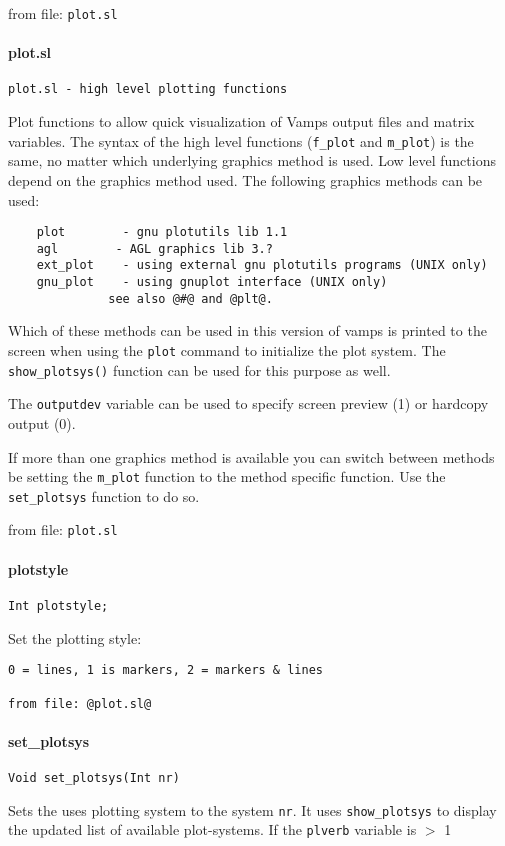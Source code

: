 from file: {\tt plot.sl}


\paragraph{plot.sl}
\begin{verbatim}
plot.sl - high level plotting functions
\end{verbatim}
Plot functions to allow quick visualization of Vamps output files
and matrix variables. The syntax of the high level functions ({\tt f\_plot}
and {\tt m\_plot}) is the same, no matter which underlying graphics method
is used. Low level functions depend on the graphics method used. The
following graphics methods can be used:
\begin{verbatim}
    plot        - gnu plotutils lib 1.1
    agl        - AGL graphics lib 3.?
    ext_plot    - using external gnu plotutils programs (UNIX only)    
    gnu_plot    - using gnuplot interface (UNIX only)    
              see also @#@ and @plt@.    
\end{verbatim}
Which of these methods can be used in this version of vamps is
printed to the screen when using the {\tt plot} command to initialize the
plot system. The {\tt show\_plotsys()} function can be used for this purpose
as well.


The {\tt outputdev} variable can be used to specify screen preview (1) or
hardcopy output (0).


If more than one graphics method is available you can switch between 
methods be setting the {\tt m\_plot} function to the method specific function.
Use the {\tt set\_plotsys} function to do so.

from file: {\tt plot.sl}


\paragraph{plotstyle}
\begin{verbatim}
Int plotstyle;
\end{verbatim}
Set the plotting style:
\begin{verbatim}
0 = lines, 1 is markers, 2 = markers & lines

from file: @plot.sl@
\end{verbatim}


\paragraph{set\_plotsys}
\begin{verbatim}
Void set_plotsys(Int nr)
\end{verbatim}
Sets the uses plotting system to the system {\tt nr}. It uses {\tt show\_plotsys}
to display the updated list of available plot-systems. If the {\tt plverb}
variable is $>$ 1


